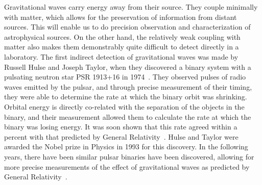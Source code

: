 Gravitational waves carry energy away from their source. They couple 
minimally with matter, which allows for the preservation of information from 
distant sources. This will enable us to do precision observation and 
characterization of astrophysical sources. 
On the other hand, the relatively weak coupling with matter also makes them
demonstrably quite difficult to detect directly in a laboratory.
The first indirect detection of gravitational waves was made by Russell Hulse 
and Joseph Taylor, when they discovered a binary system with a pulsating neutron
star PSR 1913+16 in 1974~\cite{hulse}. They observed pulses of radio waves
emitted by the pulsar, and through precise measurement of their timing,
they were able to determine the rate at which the binary orbit was shrinking.
Orbital energy is directly co-related with the separation of the objects in 
the binary, and
their measurement allowed them to calculate the rate at which the binary 
was losing energy. It was soon shown that this rate agreed within a percent
with that predicted by General Relativity~\cite{Weisberg:1981mt,Taylor:1989}.
Hulse and Taylor were awarded the Nobel prize in Physics in 1993 for this 
discovery. In the following years, there have been similar pulsar binaries
have been discovered, allowing for more precise measurements of the effect
of gravitational waves as predicted by General Relativity~\cite{Burgay:2003jj}.



